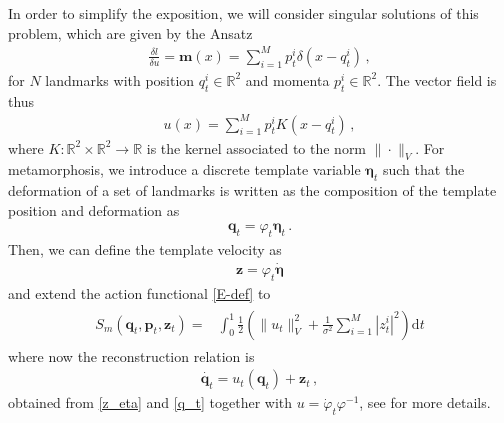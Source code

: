 \documentclass[runningheads]{llncs}
\newcommand{\half}{\frac 12}
\newcommand{\norm}[2]{\| #1 \|_{ #2 }}
\newcommand{\vnorm}[1]{\norm{ #1 }{V}}
\newcommand{\diff}[1]{\text{d} #1}
\begin{document}
In order to simplify the exposition, we will consider singular solutions of this
problem, which are given by the Ansatz
\begin{align}
  \frac{\delta l}{\delta u} = \mathbf m(x) = \sum_{i=1}^M p_t^i \delta(x-q_t^i)\,, 
\end{align}
for $N$ landmarks with position $q_t^i\in \mathbb R^2 $ and momenta $p_t^i \in
\mathbb R^2$. The vector field is thus 
\begin{align}
  u(x) = \sum_{i=1}^M p_t^i K(x-q_t^i)\,, 
  \label{u-def}
\end{align}
where $K:\mathbb R^2\times \mathbb R^2\to \mathbb R$ is the kernel associated to
the norm $\|\cdot \|_V$.  For metamorphosis, we introduce a discrete template
variable $\boldsymbol \eta_t$ such that the deformation of a set of landmarks is
written as the composition of the template position and deformation as
\begin{align}
  \mathbf q_t = \varphi_t \boldsymbol \eta_t\, . 
  \label{q_t}
\end{align}
Then, we can define the template velocity as 
\begin{align}
  \mathbf z = \varphi_t \dot {\boldsymbol \eta}
  \label{z_eta}
\end{align}
and extend the action functional \eqref{E-def} to 
\begin{align}
  \begin{split}
    S_m(\mathbf q_t, \mathbf p_t, \mathbf z_t) = & \int_0^1
    \half  \left (\vnorm{u_t}^2 + \frac{1}{\sigma^2} \sum_{i=1}^M |z_t^i|^2\right )\diff{t}
  \end{split}
  \label{E_m-def}
\end{align}
where now the reconstruction relation is 
\begin{align}
    \dot{\mathbf q_t} = u_t (\mathbf q_t) + \mathbf z_t\, , 
    \label{dq-m}
\end{align}
obtained from \eqref{z_eta} and \eqref{q_t} together with  $u= \dot \varphi_t \varphi^{-1}$, 
see \cite{holm2009euler} for more details.  
\end{document}
